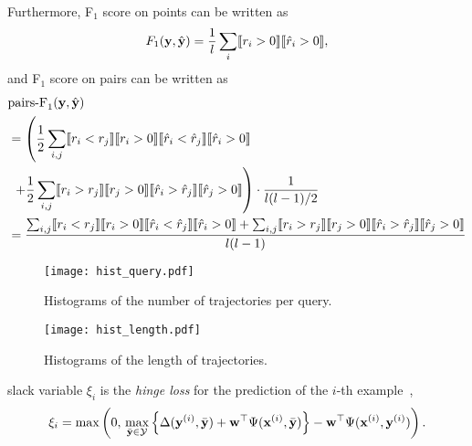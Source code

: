 Furthermore, F$_1$ score on points can be written as
\begin{equation*}
F_1(\mathbf{y}, \hat{\mathbf{y}}) = \frac{1}{l} \sum_i \llbracket r_i > 0 \rrbracket  \llbracket \hat{r}_i > 0 \rrbracket,
\end{equation*}
and F$_1$ score on pairs can be written as
\begin{align*}
& \text{pairs-F}_1(\mathbf{y}, \hat{\mathbf{y}}) \\
&= \left( \frac{1}{2} \sum_{i,j} \llbracket r_i < r_j \rrbracket  \llbracket r_i > 0 \rrbracket \llbracket \hat{r}_i < \hat{r}_j \rrbracket  \llbracket \hat{r}_i > 0 \rrbracket \right. \\
&  \left. ~+ \frac{1}{2} \sum_{i,j} \llbracket r_i > r_j \rrbracket  \llbracket r_j > 0 \rrbracket \llbracket \hat{r}_i > \hat{r}_j \rrbracket  \llbracket \hat{r}_j > 0 \rrbracket \right)
   \cdot \frac{1}{l(l-1)/2} \\
&= \frac{\sum_{i,j} \llbracket r_i < r_j \rrbracket  \llbracket r_i > 0 \rrbracket \llbracket \hat{r}_i < \hat{r}_j \rrbracket  \llbracket \hat{r}_i > 0 \rrbracket +
         \sum_{i,j} \llbracket r_i > r_j \rrbracket  \llbracket r_j > 0 \rrbracket \llbracket \hat{r}_i > \hat{r}_j \rrbracket  \llbracket \hat{r}_j > 0 \rrbracket}
        {l(l-1)}
\end{align*}





\begin{figure}[t]
	\centering
	\texttt{[image: hist\_query.pdf]}
	\caption{Histograms of the number of trajectories per query.}
	\label{fig:hist}
\end{figure}


\begin{figure}[t]
	\centering
	\texttt{[image: hist\_length.pdf]}
	\caption{Histograms of the length of trajectories.}
	\label{fig:hist}
\end{figure}

\clearpage

%



slack variable $\xi_i$ is the \emph{hinge loss} for the prediction of the $i$-th example~\cite{tsochantaridis2005large},
\begin{equation*}
\xi_i = \max \left( 0, \, 
        \max_{\bar{\mathbf{y}} \in \mathcal{Y}}
        \left\{ \Delta(\mathbf{y}^{(i)}, \bar{\mathbf{y}}) + \mathbf{w}^\top \Psi(\mathbf{x}^{(i)}, \bar{\mathbf{y}}) \right\} - \mathbf{w}^\top \Psi(\mathbf{x}^{(i)}, \mathbf{y}^{(i)}) \right).
\end{equation*}

